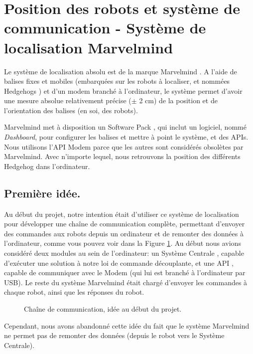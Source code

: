 \section{Position des robots et système de communication - Système de localisation Marvelmind} \label{sec:marvelmind}

Le système de localisation absolu est de la marque Marvelmind \cite{marvelmind-url}. A l’aide de balises fixes et mobiles (embarquées sur les robots à localiser, et nommées \og Hedgehogs \fg{}) et d'un modem branché à l'ordinateur, le système permet d’avoir une mesure absolue relativement précise ($\pm$ 2 cm) de la position et de l’orientation des balises (en soi, des robots). 

Marvelmind met à disposition un \og Software Pack \fg{}, qui inclut un logiciel, nommé \textit{Dashboard}, pour configurer les balises et mettre à point le système, et des APIs. Nous utilisons l'\og API Modem \fg{} parce que les autres sont considérés obsolètes par Marvelmind. Avec n'importe lequel, nous retrouvons la position des différents Hedgehog dans l'ordinateur. 

\subsection{Première idée.}
Au début du projet, notre intention était d'utiliser ce système de localisation pour développer une chaîne de communication complète, permettant d'envoyer des commandes aux robots depuis un ordinateur et de remonter des données à l'ordinateur, comme vous pouvez voir dans la Figure \ref{diagram:communication}. Au début nous avions considéré deux modules au sein de l'ordinateur: un \og Système Centrale \fg{}, capable d'exécuter une solution à notre loi de commande découplante, et une \og API \fg{}, capable de communiquer avec le Modem (qui lui est branché à l'ordinateur par USB). Le reste du système Marvelmind était chargé d'envoyer les commandes à chaque robot, ainsi que les réponses du robot.

\begin{figure}[h!]
    \centering
    
    \caption{Chaîne de communication, idée au début du projet.}
    \label{diagram:communication}
\end{figure}

Cependant, nous avons abandonné cette idée du fait que le système Marvelmind ne permet pas de remonter des données (depuis le robot vers le Système Centrale). 

